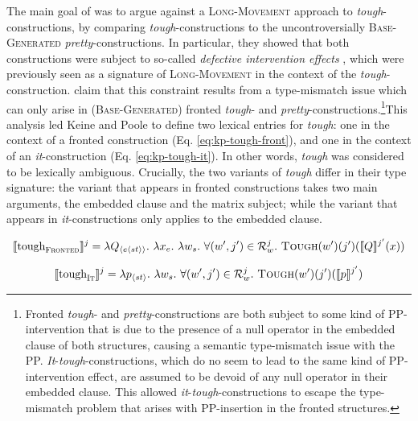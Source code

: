 \documentclass[11pt]{article}
\begin{document}
The main goal of \cite{Keine2017} was to argue against a \textsc{Long-Movement} approach to \textit{tough}-constructions, by comparing \textit{tough}-constructions to the uncontroversially \textsc{Base-Generated} \textit{pretty}-constructions. In particular, they showed that both constructions were subject to so-called \textit{defective intervention effects} \cite{Hartman2011}, which were previously seen as a signature of \textsc{Long-Movement} in the context of the \textit{tough}-construction. \cite{Keine2017} claim that this constraint results from a type-mismatch issue which can only arise in (\textsc{Base-Generated}) fronted \textit{tough}- and \textit{pretty}-constructions.\footnote{Fronted \textit{tough}- and \textit{pretty}-constructions are both subject to some kind of PP-intervention that is due to the presence of a null operator in the embedded clause of both structures, causing a semantic type-mismatch issue with the PP. \textit{It}-\textit{tough}-constructions, which do no seem to lead to the same kind of PP-intervention effect, are assumed to be devoid of any null operator in their embedded clause. This allowed \textit{it}-\textit{tough}-constructions to escape the type-mismatch problem that arises with PP-insertion in the fronted structures.}This analysis led Keine and Poole to define two lexical entries for \textit{tough}: one in the context of a fronted construction (Eq. \ref{eq:kp-tough-front}), and one in the context of an \textit{it}-construction (Eq. \ref{eq:kp-tough-it}). In other words, \textit{tough} was considered to be lexically ambiguous. Crucially, the two variants of \textit{tough} differ in their type signature: the variant that appears in fronted constructions takes two main arguments, the embedded clause and the matrix subject; while the variant that appears in \textit{it}-constructions only applies to the embedded clause.
	

	\begin{equation}\label{eq:kp-tough-front}
	\llbracket\text{tough}_{\text{\textsc{Fronted}}}\rrbracket^j = \lambda Q_{\langle e \langle st \rangle\rangle}. \ \lambda x_e. \ \lambda w_s. \ \forall (w', j') \in \mathcal{R}_w^j. \ \text{\textsc{Tough}}(w')(j')(\llbracket Q \rrbracket^{j'}(x))
	\end{equation}

	\begin{equation}\label{eq:kp-tough-it}
	\llbracket\text{tough}_{\text{\textsc{It}}}\rrbracket^j = \lambda p_{\langle st \rangle}. \ \lambda w_s. \ \forall (w', j') \in \mathcal{R}_w^j. \ \text{\textsc{Tough}}(w')(j')(\llbracket p \rrbracket^{j'})
	\end{equation}
\end{document}
